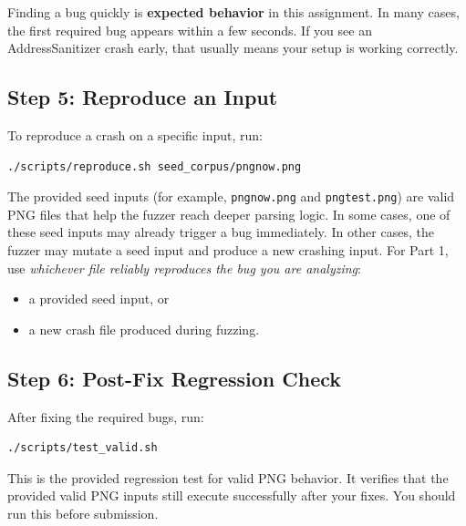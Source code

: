 \documentclass[11pt]{article}
\begin{document}
Finding a bug quickly is \textbf{expected behavior} in this assignment. In many cases, the first required bug appears within a few seconds. If you see an AddressSanitizer crash early, that usually means your setup is working correctly.

\subsection*{Step 5: Reproduce an Input}
To reproduce a crash on a specific input, run:
\begin{lstlisting}[style=bashstyle]
./scripts/reproduce.sh seed_corpus/pngnow.png
\end{lstlisting}

The provided seed inputs (for example, \texttt{pngnow.png} and \texttt{pngtest.png}) are valid PNG files that help the fuzzer reach deeper parsing logic. In some cases, one of these seed inputs may already trigger a bug immediately. In other cases, the fuzzer may mutate a seed input and produce a new crashing input. For Part 1, use \emph{whichever file reliably reproduces the bug you are analyzing}:
\begin{itemize}
    \item a provided seed input, or
    \item a new crash file produced during fuzzing.
\end{itemize}

\subsection*{Step 6: Post-Fix Regression Check}
After fixing the required bugs, run:
\begin{lstlisting}[style=bashstyle]
./scripts/test_valid.sh
\end{lstlisting}

This is the provided regression test for valid PNG behavior. It verifies that the provided valid PNG inputs still execute successfully after your fixes. You should run this before submission.
\end{document}
